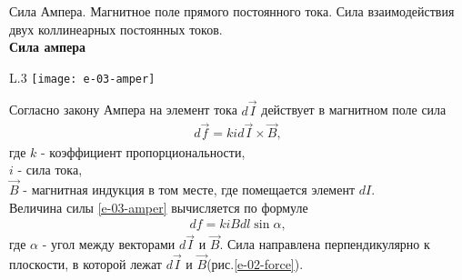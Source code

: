 \documentclass[__main__.tex]{subfiles}
\begin{document}
Сила Ампера. Магнитное поле прямого постоянного тока. Сила взаимодействия двух коллинеарных постоянных токов.\\ 

\textbf{Сила ампера}\\

\begin{wrapfigure}{L}{.3\linewidth}
	\texttt{[image: e-03-amper]}
	\caption{Сила Ампера}
	\label{e-02-force}
\end{wrapfigure}
Согласно закону Ампера на элемент тока $d\vec{I}$ действует в магнитном поле сила
\begin{gather}
	d\vec{f} = kid\vec{I} \times \vec{B},
	\label{e-03-amper}
\end{gather}
где $k$ - коэффициент пропорциональности,\\
$i$ - сила тока,\\
$\vec{B}$ - магнитная индукция в том месте, где помещается элемент $dI$.\\
Величина силы \ref{e-03-amper} вычисляется по формуле 
\begin{gather}
	df = kiBdl\sin{\alpha},
\end{gather}
где $\alpha$ - угол между векторами $d\vec{I}$ и $\vec{B}$. Сила направлена перпендикулярно к плоскости, в которой лежат $d\vec{I}$ и $\vec{B}$(рис.\ref{e-02-force}).\\
\end{document}
